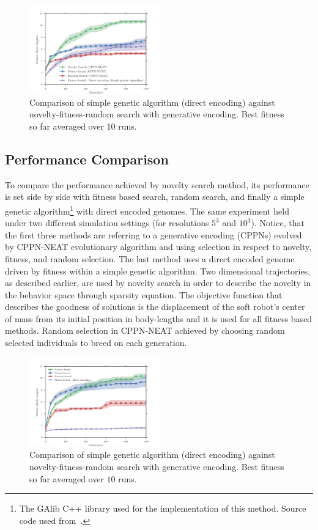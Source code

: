 \documentclass{sig-alternate}
\begin{document}
\begin{figure}[t!]
\centering
\includegraphics[width=0.5\textwidth]{../Figures/Results/FitNovRandomDirectSize5.pdf}
\caption{Comparison of simple genetic algorithm (direct encoding) against novelty-fitness-random search with generative encoding. Best fitness so far averaged over $10$ runs.}
\label{fig:FitNovRandomDirectSize5}
\end{figure}

\subsection{Performance Comparison}

To compare the performance achieved by novelty search method, its performance is set side by side with fitness based search, random search, and finally a simple genetic algorithm\footnote{The GAlib C++ library \cite{wall1996galib} used for the implementation of this method. Source code used from~\cite{cheney2013unshackling}.} with direct encoded genomes. The same experiment held under two different simulation settings (for resolutions $5^3$ and $10^3$). Notice, that the first three methods are referring to a generative encoding (CPPNs) evolved by CPPN-NEAT evolutionary algorithm and using selection in respect to novelty, fitness, and random selection. The last method uses a direct encoded genome driven by fitness within a simple genetic algorithm. Two dimensional trajectories, as described earlier, are used by novelty search in order to describe the novelty in the behavior space through sparsity equation. The objective function that describes the goodness of solutions is the displacement of the soft robot's center of mass from its initial position in body-lengths and it is used for all fitness based methods. Random selection in CPPN-NEAT achieved by choosing random selected individuals to breed on each generation.

\begin{figure}[t!]
\centering
\includegraphics[width=0.5\textwidth]{../Figures/Results/FitvsNovVsDirSize10.pdf}
\caption{Comparison of simple genetic algorithm (direct encoding) against novelty-fitness-random search with generative encoding. Best fitness so far averaged over $10$ runs.}
\label{fig:FitvsNovVsDirSize10}
\end{figure} 
\end{document}
